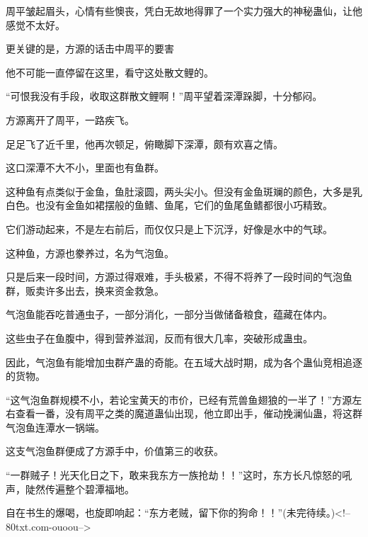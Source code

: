 \begin{this_body}
周平皱起眉头，心情有些懊丧，凭白无故地得罪了一个实力强大的神秘蛊仙，让他感觉不太好。

更关键的是，方源的话击中周平的要害

他不可能一直停留在这里，看守这处散文鲤的。

“可恨我没有手段，收取这群散文鲤啊！”周平望着深潭跺脚，十分郁闷。

方源离开了周平，一路疾飞。

足足飞了近千里，他再次顿足，俯瞰脚下深潭，颇有欢喜之情。

这口深潭不大不小，里面也有鱼群。

这种鱼有点类似于金鱼，鱼肚滚圆，两头尖小。但没有金鱼斑斓的颜色，大多是乳白色。也没有金鱼如裙摆般的鱼鳍、鱼尾，它们的鱼尾鱼鳍都很小巧精致。

它们游动起来，不是左右前后，而仅仅只是上下沉浮，好像是水中的气球。

这种鱼，方源也豢养过，名为气泡鱼。

只是后来一段时间，方源过得艰难，手头极紧，不得不将养了一段时间的气泡鱼群，贩卖许多出去，换来资金救急。

气泡鱼能吞吃普通虫子，一部分消化，一部分当做储备粮食，蕴藏在体内。

这些虫子在鱼腹中，得到营养滋润，反而有很大几率，突破形成蛊虫。

因此，气泡鱼有能增加虫群产蛊的奇能。在五域大战时期，成为各个蛊仙竞相追逐的货物。

“这气泡鱼群规模不小，若论宝黄天的市价，已经有荒兽鱼翅狼的一半了！”方源左右查看一番，没有周平之类的魔道蛊仙出现，他立即出手，催动挽澜仙蛊，将这群气泡鱼连潭水一锅端。

这支气泡鱼群便成了方源手中，价值第三的收获。

“一群贼子！光天化日之下，敢来我东方一族抢劫！！”这时，东方长凡惊怒的吼声，陡然传遍整个碧潭福地。

自在书生的爆喝，也旋即响起：“东方老贼，留下你的狗命！！”(未完待续。)<!--80txt.com-ouoou-->

\end{this_body}

